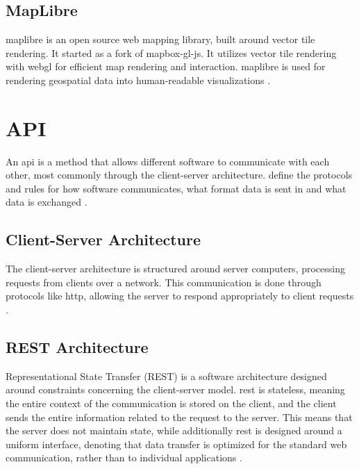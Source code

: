 \subsection{MapLibre}
\label{sec:maplibre}

\gls{maplibre} is an open source web mapping library, built around vector tile rendering. It started as a fork of mapbox-gl-js. It utilizes vector tile rendering with \acrfull{webgl} for efficient map rendering and interaction. \gls{maplibre} is used for rendering geospatial data into human-readable visualizations \parencite{maplibre_about,maplibre_github}.

\section{API}
\label{sec:api_theory}
\noindent
An \acrfull{api} is a method that allows different software to communicate with each other, most commonly through the client-server architecture.  define the protocols and rules for how software communicates, what format data is sent in and what data is exchanged \parencite{api_amazon,api_ibm}.

\subsection{Client-Server Architecture}
\label{sec:client_server_theory}
\noindent
The client-server architecture is structured around server computers, processing requests from clients over a network. This communication is done through protocols like \acrfull{http}, allowing the server to respond appropriately to client requests \parencite{client_server_review}.


\subsection{REST Architecture}
\label{sec:rest_theory}
\noindent 
Representational State Transfer (REST) is a software architecture designed around constraints concerning the client-server model. \acrshort{rest} is stateless, meaning the entire context of the communication is stored on the client, and the client sends the entire information related to the request to the server. This means that the server does not maintain state, while additionally \acrshort{rest} is designed around a uniform interface, denoting that data transfer is optimized for the standard web communication, rather than to individual applications \parencite{Fielding_REST}.



